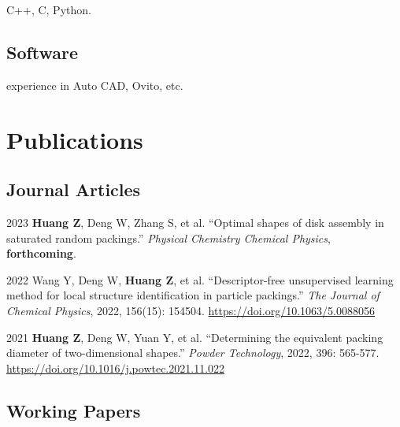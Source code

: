 \documentclass[12pt,letterpaper]{report}
\begin{document}
	\begin{tablist}
		
		C++, C, Python.
	\end{tablist}
	
	\subsection*{Software}
	
	\begin{tablist}
		
		 experience in Auto CAD, Ovito, etc.
		
	\end{tablist}
	
	
	
	
	\section*{Publications}

    \subsection*{Journal Articles}

    \begin{tablist}

        \item[2023] \tab{}\textbf{Huang Z}, Deng W, Zhang S, et al. \enquote{Optimal shapes of disk assembly in saturated random packings.} \textit{Physical Chemistry Chemical Physics}, \textbf{forthcoming}.

        \item[2022] \tab{}Wang Y, Deng W, \textbf {Huang Z}, et al. \enquote{Descriptor-free unsupervised learning method for local structure identification in particle packings.} \textit{The Journal of Chemical Physics}, 2022, 156(15): 154504. \href{https://doi.org/10.1063/5.0088056}{https://doi.org/10.1063/5.0088056}

        \item[2021] \tab{}\textbf{Huang Z}, Deng W, Yuan Y, et al. \enquote{Determining the equivalent packing diameter of two-dimensional shapes.} \textit{Powder Technology}, 2022, 396: 565-577. \href{https://doi.org/10.1016/j.powtec.2021.11.022}{https://doi.org/10.1016/j.powtec.2021.11.022}


    \end{tablist}

	\subsection*{Working Papers}
	
\end{document}
